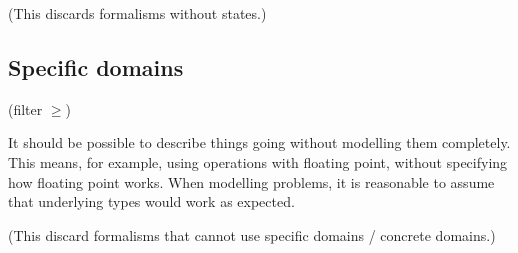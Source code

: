 (This discards formalisms without states.)

\subsection{Specific domains}

(filter $\geq $)

It should be possible to describe things going without modelling them completely.
This means, for example, using operations with floating point, without specifying how floating point works.
When modelling problems, it is reasonable to assume that underlying types would work as expected.

(This discard formalisms that cannot use specific domains / concrete domains.)



